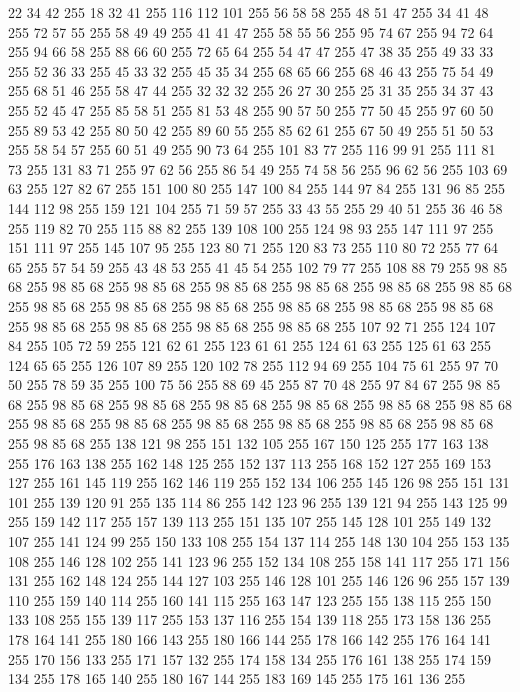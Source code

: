 22 34 42 255 18 32 41 255 116 112 101 255 56 58 58 255 48 51 47 255 34 41 48 255 72 57 55 255 58 49 49 255 41 41 47 255 58 55 56 255 95 74 67 255 94 72 64 255 94 66 58 255 88 66 60 255 72 65 64 255 54 47 47 255 47 38 35 255 49 33 33 255 52 36 33 255 45 33 32 255 45 35 34 255 68 65 66 255 68 46 43 255 75 54 49 255 68 51 46 255 58 47 44 255 32 32 32 255 26 27 30 255 25 31 35 255 34 37 43 255 52 45 47 255 85 58 51 255 81 53 48 255 90 57 50 255 77 50 45 255 97 60 50 255 89 53 42 255 80 50 42 255 89 60 55 255 85 62 61 255 67 50 49 255 51 50 53 255 58 54 57 255 60 51 49 255 90 73 64 255 101 83 77 255 116 99 91 255 111 81 73 255 131 83 71 255 97 62 56 255 86 54 49 255 74 58 56 255 96 62 56 255 103 69 63 255 127 82 67 255 151 100 80 255 147 100 84 255 144 97 84 255 131 96 85 255 144 112 98 255 159 121 104 255 71 59 57 255 33 43 55 255 29 40 51 255
36 46 58 255 119 82 70 255 115 88 82 255 139 108 100 255 124 98 93 255 147 111 97 255 151 111 97 255 145 107 95 255 123 80 71 255 120 83 73 255 110 80 72 255 77 64 65 255 57 54 59 255 43 48 53 255 41 45 54 255 102 79 77 255 108 88 79 255 98 85 68 255 98 85 68 255 98 85 68 255 98 85 68 255 98 85 68 255 98 85 68 255 98 85 68 255 98 85 68 255 98 85 68 255 98 85 68 255 98 85 68 255 98 85 68 255 98 85 68 255 98 85 68 255 98 85 68 255 98 85 68 255 98 85 68 255 107 92 71 255 124 107 84 255 105 72 59 255 121 62 61 255 123 61 61 255 124 61 63 255 125 61 63 255 124 65 65 255 126 107 89 255 120 102 78 255 112 94 69 255 104 75 61 255 97 70 50 255 78 59 35 255 100 75 56 255 88 69 45 255 87 70 48 255 97 84 67 255 98 85 68 255 98 85 68 255 98 85 68 255 98 85 68 255 98 85 68 255 98 85 68 255 98 85 68 255 98 85 68 255 98 85 68 255 98 85 68 255 98 85 68 255 98 85 68 255
98 85 68 255 98 85 68 255 138 121 98 255 151 132 105 255 167 150 125 255 177 163 138 255 176 163 138 255 162 148 125 255 152 137 113 255 168 152 127 255 169 153 127 255 161 145 119 255 162 146 119 255 152 134 106 255 145 126 98 255 151 131 101 255 139 120 91 255 135 114 86 255 142 123 96 255 139 121 94 255 143 125 99 255 159 142 117 255 157 139 113 255 151 135 107 255 145 128 101 255 149 132 107 255 141 124 99 255 150 133 108 255 154 137 114 255 148 130 104 255 153 135 108 255 146 128 102 255 141 123 96 255 152 134 108 255 158 141 117 255 171 156 131 255 162 148 124 255 144 127 103 255 146 128 101 255 146 126 96 255 157 139 110 255 159 140 114 255 160 141 115 255 163 147 123 255 155 138 115 255 150 133 108 255 155 139 117 255 153 137 116 255 154 139 118 255 173 158 136 255 178 164 141 255 180 166 143 255 180 166 144 255 178 166 142 255 176 164 141 255 170 156 133 255 171 157 132 255 174 158 134 255 176 161 138 255 174 159 134 255 178 165 140 255 180 167 144 255 183 169 145 255 175 161 136 255
